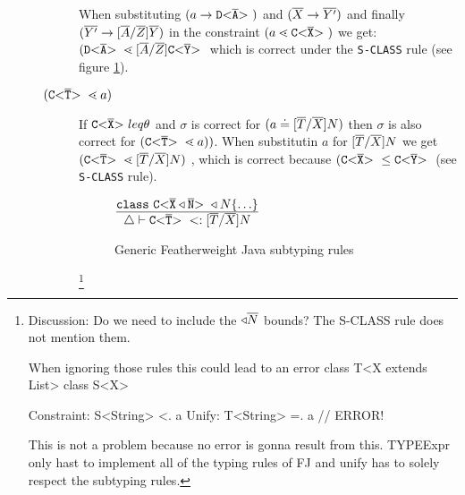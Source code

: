 \documentclass[acmsmall,screen,review]{acmart}
\begin{document}
\begin{description}
\begin{description}
When substituting $(a \to \mathtt{D {\tt <} \overline{A} {\tt >} \ })$ and $(\overline{X} \to \overline{Y'})$
and finally $ (\overline{Y'} \to [\overline{A}/\overline{Z}]\overline{Y})$ in the constraint $(a \lessdot \mathtt{C {\tt <} \overline{X} {\tt >} \ })$
we get: $(\mathtt{D {\tt <} \overline{A} {\tt >} \ } \lessdot [\overline{A}/\overline{Z}]\mathtt{C {\tt <} \overline{Y} {\tt >} \ }$
which is correct under the \texttt{S-CLASS} rule (see figure \ref{fig:gfj-subtyping-rules}).

\item[$(\mathtt{C {\tt <} \overline{T} {\tt >} \ } \lessdot a)$] If $\mathtt{C {\tt <} \overline{X} {\tt >} \ } leq \theta$ and $\sigma$ is correct for $(a \doteq [\overline{T}/\overline{X}]N)$
then $\sigma$ is also correct for $(\mathtt{C {\tt <} \overline{T} {\tt >} \ } \lessdot a))$.
When substitutin $a$ for $[\overline{T}/\overline{X}]N$ we get 
$(\mathtt{C {\tt <} \overline{T} {\tt >} \ } \lessdot [\overline{T}/\overline{X}]N)$
, which is correct because $(\mathtt{C {\tt <} \overline{X} {\tt >} \ } \leq \mathtt{C {\tt <} \overline{Y} {\tt >} \ }$
(see \texttt{S-CLASS} rule).

\begin{figure}
$\frac{\displaystyle 
  \texttt{class}\ \mathtt{C {\tt <} \overline{X} \triangleleft \overline{N} {\tt >} \ } \triangleleft N \{  \ldots  \}
}{\displaystyle 
  \triangle \vdash \mathtt{C {\tt <} \overline{T} {\tt >} \ } <: [\overline{T}/\overline{X}]N
}$ 
\caption{Generic Featherweight Java subtyping rules}\label{fig:gfj-subtyping-rules}
\end{figure}

\footnote{
Discussion:
Do we need to include the $\triangleleft \overline{N}$ bounds?
The S-CLASS rule does not mention them.

When ignoring those rules this could lead to an error
class T<X extends List> {
}
class S<X>{}

Constraint: S<String> <. a
Unify: T<String> =. a // ERROR!

This is not a problem because no error is gonna result from this.
TYPEExpr only hast to implement all of the typing rules of FJ
and unify has to solely respect the subtyping rules.

}
\end{description}


\end{description}
\end{document}
